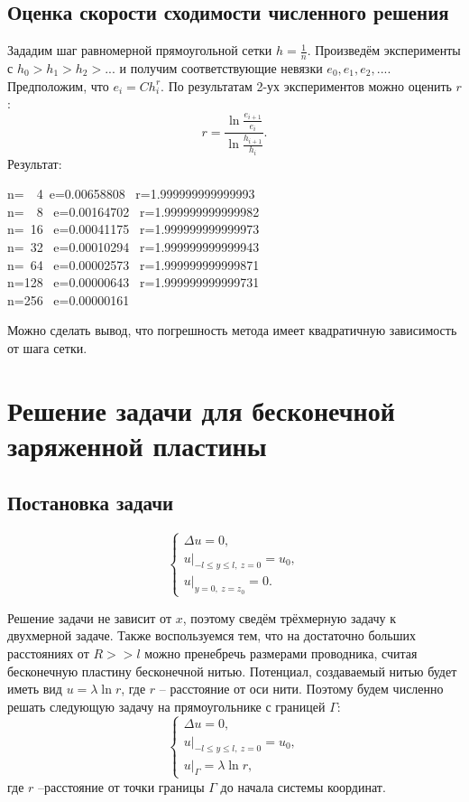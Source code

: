 \documentclass{report}
\begin{document}
\section{Оценка скорости сходимости численного решения}
Зададим шаг равномерной прямоугольной сетки $h=\frac{1}{n}$. Произведём эксперименты с $h_0>h_1>h_2>...$ и получим соответствующие невязки $e_0, e_1, e_2, ...$. Предположим, что $e_i=Ch_i^r$. По результатам 2-ух экспериментов можно оценить $r$:
\begin{equation}
	r = \frac{\ln{\frac{e_{i+1}}{e_i}}}{\ln{\frac{h_{i+1}}{h_i}}}.
\end{equation}
Результат:\\
\begin{center}
	n=~~4~e=0.00658808 ~r=1.999999999999993\\
	n=~~8~ e=0.00164702~ r=1.999999999999982\\
	n=~16 ~e=0.00041175~ r=1.999999999999973\\
	n=~32 ~e=0.00010294~ r=1.999999999999943\\
	n=~64 ~e=0.00002573~ r=1.999999999999871\\
	n=128 ~e=0.00000643~ r=1.999999999999731\\
	n=256 ~e=0.00000161
\end{center}
Можно сделать вывод, что погрешность метода имеет квадратичную зависимость от шага сетки.

\chapter{Решение задачи для бесконечной заряженной пластины}
\section{Постановка задачи}
\begin{equation}
	\begin{cases}
		\Delta u = 0,\\
		u|_{-l \leq y \leq l,~z=0}=u_0,\\
		u|_{y=0,~ z=z_0}=0.
	\end{cases}
\end{equation}

Решение задачи не зависит от $x$, поэтому сведём трёхмерную задачу к двухмерной задаче. Также воспользуемся тем, что на достаточно больших расстояниях от $R>>l$ можно пренебречь размерами проводника, считая бесконечную пластину бесконечной нитью. Потенциал, создаваемый нитью будет иметь вид $u=\lambda \ln r$, где $r$ -- расстояние от оси нити. Поэтому будем численно решать следующую задачу на прямоугольнике с границей $\Gamma$:
\begin{equation}\label{plate_numerical_problem}
	\begin{cases}
		\Delta u = 0,\\
		u|_{-l \leq y \leq l,~z=0}=u_0,\\
		u|_{\Gamma}=\lambda \ln r,
	\end{cases}
\end{equation}
где $r$ --расстояние от точки границы $\Gamma$ до начала системы координат.
\end{document}
